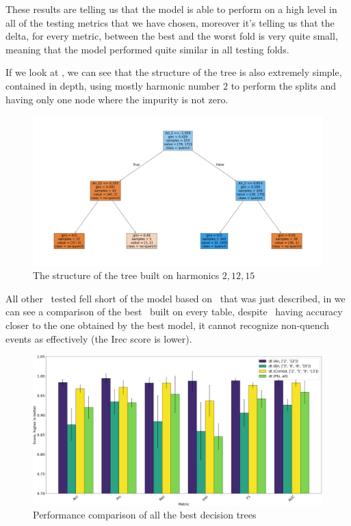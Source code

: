These results are telling us that the model is able to perform on a high level in all of the testing
metrics that we have chosen, moreover it's telling us that the delta, for every metric, between the
best and the worst fold is very quite small, meaning that the model performed quite similar in all
testing folds.

If we look at , we can see that the structure of the tree is also
extremely simple, contained in depth, using mostly harmonic number $2$ to perform the splits and
having only one node where the impurity is not zero.
\begin{figure}[h!]
	\centering
	\includegraphics[width=\linewidth]{img/An_2_12_pt_dt.png}
	\caption{The structure of the tree built on harmonics $2, 12, 15$} \label{fig:dt-an-2-12-pt}
\end{figure}
All other \dts\ tested fell short of the model based on \an\ that was just described, in
 we can see a comparison of the best \dts\ built on every table, despite \cnmod\
having accuracy closer to the one obtained by the best model, it cannot recognize non-quench events
as effectively (the Irec score is lower).
\begin{figure}[t]
	\centering
	\includegraphics[width=\linewidth]{img/best_dts.png}
	\caption{Performance comparison of all the best decision trees} \label{fig:best-dts}
\end{figure}

